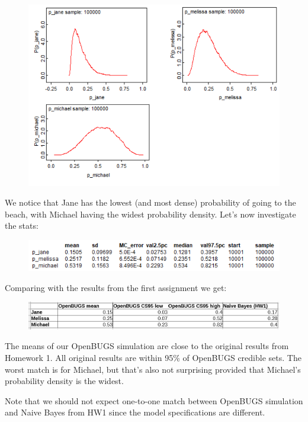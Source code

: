 \documentclass[a4 paper]{article}
\begin{document}
\begin{figure}[H]
	\includegraphics[scale=1.0]{q1}
	\centering
	\label{q1}
\end{figure}

We notice that Jane has the lowest (and most dense) 
probability of going to the beach, with Michael 
having the widest probability density.
Let's now investigate the stats:

\begin{figure}[H]
	\includegraphics[scale=1.0]{q1_2}
	\centering
	\label{q1_2}
\end{figure}
 
Comparing with the results from the first 
assignment we get:

\begin{figure}[H]
	\includegraphics[scale=1.0]{q1_3}
	\centering
	\label{q1_3}
\end{figure}
 
The means of our OpenBUGS simulation are close 
to the original results from Homework 1. All 
original results are within 95\% of
OpenBUGS credible sets. The worst match is for 
Michael, but that's also not surprising 
provided that Michael's probability density is 
the widest.

Note that we should not expect one-to-one
match between OpenBUGS simulation and 
Naive Bayes from HW1 since the model specifications
are different.  \\
\end{document}
